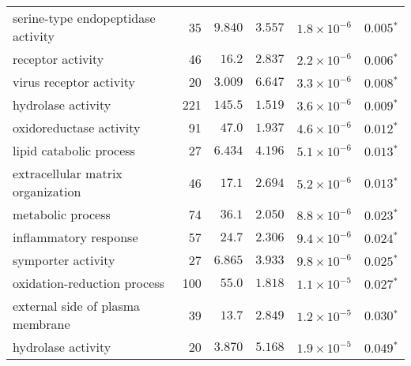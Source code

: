 \begin{longtable}{|l|r|r|r|r|r|}
                serine-type endopeptidase activity &                      35 &                $ 9.840$ &   $ 3.557$ &  $1.8\times 10^{-6}$ &             $\bm{ 0.005{^*}}$ \\
                                 receptor activity &                      46 &                $  16.2$ &   $ 2.837$ &  $2.2\times 10^{-6}$ &             $\bm{ 0.006{^*}}$ \\
                           virus receptor activity &                      20 &                $ 3.009$ &   $ 6.647$ &  $3.3\times 10^{-6}$ &             $\bm{ 0.008{^*}}$ \\
                                hydrolase activity &                     221 &                $ 145.5$ &   $ 1.519$ &  $3.6\times 10^{-6}$ &             $\bm{ 0.009{^*}}$ \\
                           oxidoreductase activity &                      91 &                $  47.0$ &   $ 1.937$ &  $4.6\times 10^{-6}$ &             $\bm{ 0.012{^*}}$ \\
                           lipid catabolic process &                      27 &                $ 6.434$ &   $ 4.196$ &  $5.1\times 10^{-6}$ &             $\bm{ 0.013{^*}}$ \\
                 extracellular matrix organization &                      46 &                $  17.1$ &   $ 2.694$ &  $5.2\times 10^{-6}$ &             $\bm{ 0.013{^*}}$ \\
                                 metabolic process &                      74 &                $  36.1$ &   $ 2.050$ &  $8.8\times 10^{-6}$ &             $\bm{ 0.023{^*}}$ \\
                             inflammatory response &                      57 &                $  24.7$ &   $ 2.306$ &  $9.4\times 10^{-6}$ &             $\bm{ 0.024{^*}}$ \\
                                symporter activity &                      27 &                $ 6.865$ &   $ 3.933$ &  $9.8\times 10^{-6}$ &             $\bm{ 0.025{^*}}$ \\
                       oxidation-reduction process &                     100 &                $  55.0$ &   $ 1.818$ &  $1.1\times 10^{-5}$ &             $\bm{ 0.027{^*}}$ \\
                  external side of plasma membrane &                      39 &                $  13.7$ &   $ 2.849$ &  $1.2\times 10^{-5}$ &             $\bm{ 0.030{^*}}$ \\
                                hydrolase activity &                      20 &                $ 3.870$ &   $ 5.168$ &  $1.9\times 10^{-5}$ &             $\bm{ 0.049{^*}}$ \\

\end{longtable}
